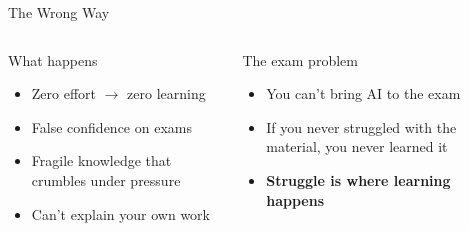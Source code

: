 \documentclass[aspectratio=169]{beamer}
\begin{document}
\begin{frame}{The Wrong Way}

\begin{center}
\end{center}

\bigskip
\begin{columns}[T]
\begin{alertblock}{What happens}
\begin{itemize}
  \item Zero effort $\to$ zero learning
  \item False confidence on exams
  \item Fragile knowledge that crumbles under pressure
  \item Can't explain your own work
\end{itemize}
\end{alertblock}

\begin{alertblock}{The exam problem}
\begin{itemize}
  \item You can't bring AI to the exam
  \item If you never struggled with the material, you never learned it
  \item \textbf{Struggle is where learning happens}
\end{itemize}
\end{alertblock}
\end{columns}
\end{frame}
\end{document}
